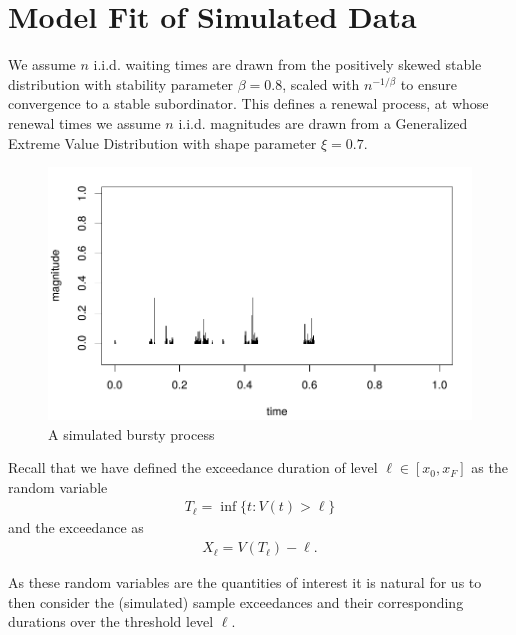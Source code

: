 \documentclass[honours,12pt]{unswthesis}
\newcommand{\1}{\mathbf 1}
\numberwithin{equation}{section}
\theoremstyle{definition}
\theoremstyle{remark}
\begin{document}
\section{Model Fit of Simulated Data}
We assume $n$ i.i.d. waiting times are drawn from the positively skewed stable
distribution with stability parameter $\beta=0.8$, scaled with 
$n^{-1/\beta}$ to ensure convergence to a stable subordinator. This defines a renewal process, at whose renewal times we assume $n$ i.i.d. magnitudes are drawn from a Generalized Extreme Value Distribution
with shape parameter $\xi = 0.7$.
	
	\begin{figure}[H]
        \centering
        \caption{A simulated bursty process}
        \includegraphics[scale=0.45]{Figures/unitCTRMprocessNoTitle.png}
    \end{figure}

Recall that we have defined the exceedance duration of level $\ell \in [x_0,x_F]$ as
the random variable
\begin{align*}
T_\ell = \inf\{t: V(t) > \ell\}
\end{align*}
and the exceedance as 
\begin{align*}
X_\ell = V(T_\ell) - \ell.
\end{align*}

As these random variables are the quantities of interest it is natural for us to then consider the (simulated) sample exceedances and their corresponding durations over the threshold level $\ell$.
	
\end{document}
